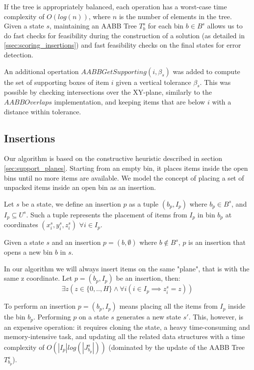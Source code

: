 If the tree is appropriately balanced, each operation has a worst-case time complexity of $O(log(n))$, where $n$ is the number of elements in the tree.
Given a state $s$, maintaining an AABB Tree $T^s_b$ for each bin $b \in B^s$ allows us to do fast checks for feasibility during the construction of a solution (as detailed in \ref{ssec:scoring_insertions}) and fast feasibility checks on the final states for error detection.

\label{aabb:get_supporting}%
An additional opertation $AABBGetSupporting(i, \beta_s)$ was added to compute the set of supporting boxes of item $i$ given a vertical tolerance $\beta_s$.
This was possible by checking intersections over the XY-plane, similarly to the $AABBOverlaps$ implementation, and keeping items that are below $i$ with a distance within tolerance.

\subsection{Insertions}
\label{sec:problem_state:insertions}%

Our algorithm is based on the constructive heuristic described in section \ref{sec:support_planes}. Starting from an empty bin, it places items inside the open bins until no more items are available. We model the concept of placing a set of unpacked items inside an open bin as an insertion.
\begin{definition}[Insertion]
    \label{def:insertion}%
    Let $s$ be a state, we define an insertion $p$ as a tuple $(b_p, I_p)$ where $b_p \in B^s$, and $I_p \subseteq U^s$. Such a tuple represents the placement of items from $I_p$ in bin $b_p$ at coordinates $(x^s_i, y^s_i, z^s_i)$ $\forall i \in I_p$.
\end{definition}
\begin{observation}
    \label{oss:state_bin_open}
    Given a state $s$ and an insertion $p = (b, \emptyset)$ where $b \notin B^s$, $p$ is an insertion that opens a new bin $b$ in $s$.
\end{observation}
\begin{observation}
    \label{obs:same_z_insertion}
    In our algorithm we will always insert items on the same "plane", that is with the same z coordinate. Let $p = (b_p, I_p)$ be an insertion, then:
    \begin{equation}
        \exists z (z \in \{0,..,H\} \land \forall i ( i \in I_p \implies z^s_i = z))
    \end{equation}
\end{observation}
To perform an insertion $p = (b_p, I_p)$ means placing all the items from $I_p$ inside the bin $b_p$. Performing $p$ on a state $s$ generates a new state $s'$. This, however, is an expensive operation: it requires cloning the state, a heavy time-consuming and memory-intensive task, and updating all the related data structures with a time complexity of $O(|I_p|log(|J^s_{b_p}|))$ (dominated by the update of the AABB Tree $T^s_{b_p}$). 

